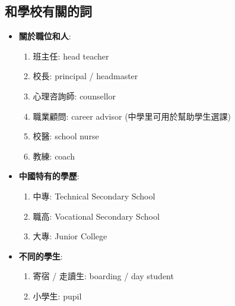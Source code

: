 \subsection{和學校有關的詞}
\begin{multicols}{2}
\begin{itemize}
  \itemsep0em
  \item \textbf{關於職位和人}:
  \begin{enumerate}
    \itemsep0em
    \item 班主任: head teacher
    \item 校長: principal / headmaster
    \item 心理咨詢師: counsellor
    \item 職業顧問: career advisor (中學里可用於幫助學生選課)
    \item 校醫: school nurse
    \item 教練: coach
  \end{enumerate}
  \item \textbf{中國特有的學歷}:
  \begin{enumerate}
    \itemsep0em
    \item 中專: Technical Secondary School
    \item 職高: Vocational Secondary School
    \item 大專: Junior College
  \end{enumerate}
  \item \textbf{不同的學生}:
  \begin{enumerate}
    \itemsep0em
    \item 寄宿 / 走讀生: boarding / day student
    \item 小學生: pupil
  \end{enumerate}
\end{itemize}
\end{multicols}


